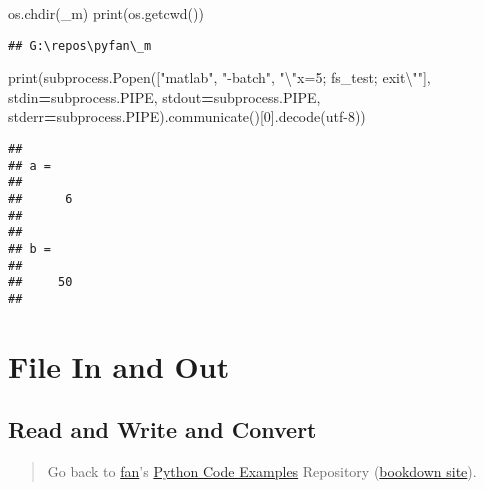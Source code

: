 \documentclass[
]{book}
\newenvironment{Shaded}{\begin{snugshade}}{\end{snugshade}}
\newcommand{\BuiltInTok}[1]{#1}
\newcommand{\CharTok}[1]{\textcolor[rgb]{0.31,0.60,0.02}{#1}}
\newcommand{\DecValTok}[1]{\textcolor[rgb]{0.00,0.00,0.81}{#1}}
\newcommand{\NormalTok}[1]{#1}
\newcommand{\OperatorTok}[1]{\textcolor[rgb]{0.81,0.36,0.00}{\textbf{#1}}}
\newcommand{\StringTok}[1]{\textcolor[rgb]{0.31,0.60,0.02}{#1}}
\begin{document}
\begin{Shaded}
\begin{Highlighting}[]
\NormalTok{os.chdir(}\StringTok{\textquotesingle{}\_m\textquotesingle{}}\NormalTok{)}
\BuiltInTok{print}\NormalTok{(os.getcwd())}
\end{Highlighting}
\end{Shaded}

\begin{verbatim}
## G:\repos\pyfan\_m
\end{verbatim}

\begin{Shaded}
\begin{Highlighting}[]
\BuiltInTok{print}\NormalTok{(subprocess.Popen([}\StringTok{"matlab"}\NormalTok{, }\StringTok{"{-}batch"}\NormalTok{, }\StringTok{"}\CharTok{\textbackslash{}"}\StringTok{x=5; fs\_test; exit}\CharTok{\textbackslash{}"}\StringTok{"}\NormalTok{],}
\NormalTok{                       stdin}\OperatorTok{=}\NormalTok{subprocess.PIPE,}
\NormalTok{                       stdout}\OperatorTok{=}\NormalTok{subprocess.PIPE,}
\NormalTok{                       stderr}\OperatorTok{=}\NormalTok{subprocess.PIPE).communicate()[}\DecValTok{0}\NormalTok{].decode(}\StringTok{\textquotesingle{}utf{-}8\textquotesingle{}}\NormalTok{))}
\end{Highlighting}
\end{Shaded}

\begin{verbatim}
## 
## a =
## 
##      6
## 
## 
## b =
## 
##     50
## 
\end{verbatim}

\hypertarget{file-in-and-out}{%
\section{File In and Out}\label{file-in-and-out}}

\hypertarget{read-and-write-and-convert}{%
\subsection{Read and Write and Convert}\label{read-and-write-and-convert}}

\begin{quote}
Go back to \href{http://fanwangecon.github.io/}{fan}'s \href{https://fanwangecon.github.io/pyfan/}{Python Code Examples} Repository (\href{https://fanwangecon.github.io/pyfan/bookdown}{bookdown site}).
\end{quote}
\end{document}
